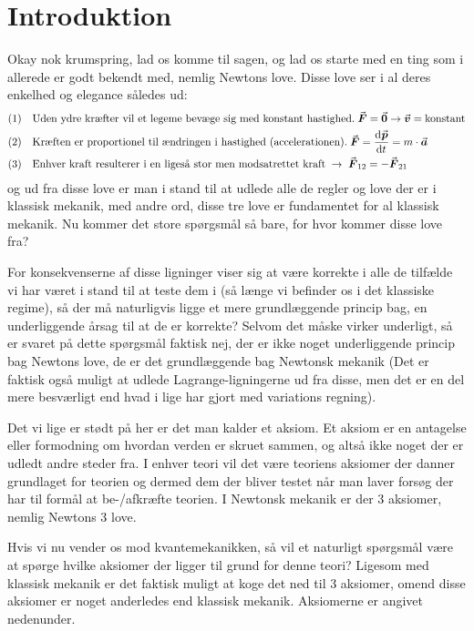 \documentclass[../Kvantemekanik.tex]{subfiles}
\begin{document}
\section{Introduktion}
Okay nok krumspring, lad os komme til sagen, og lad os starte med en ting som i allerede er godt bekendt med, nemlig Newtons love. Disse love ser i al deres enkelhed og elegance således ud:
\begin{align*}
    (1)\quad & \text{Uden ydre kræfter vil et legeme bevæge sig med konstant hastighed.} \; \v F=\v 0 \rightarrow \v v=\text{konstant}\\
    (2)\quad & \text{Kræften er proportionel til ændringen i hastighed (accelerationen).}\; \v F=\dif{t}{\v p}=m\cdot \v a\\
    (3)\quad & \text{Enhver kraft resulterer i en ligeså stor men modsatrettet kraft}\; \rightarrow \; \v F_{12}=-\v F_{21}
\end{align*}
og ud fra disse love er man i stand til at udlede alle de regler og love der er i klassisk mekanik, med andre ord, disse tre love er fundamentet for al klassisk mekanik. Nu kommer det store spørgsmål så bare, for hvor kommer disse love fra?

For konsekvenserne af disse ligninger viser sig at være korrekte i alle de tilfælde vi har været i stand til at teste dem i (så længe vi befinder os i det klassiske regime), så der må naturligvis ligge et mere grundlæggende princip bag, en underliggende årsag til at de er korrekte? Selvom det måske virker underligt, så er svaret på dette spørgsmål faktisk nej, der er ikke noget underliggende princip bag Newtons love, de er det grundlæggende bag Newtonsk mekanik (Det er faktisk også muligt at udlede Lagrange-ligningerne ud fra disse, men det er en del mere besværligt end hvad i lige har gjort med variations regning).

Det vi lige er stødt på her er det man kalder et aksiom. Et aksiom er en antagelse eller formodning om hvordan verden er skruet sammen, og altså ikke noget der er udledt andre steder fra. I enhver teori vil det være teoriens aksiomer der danner grundlaget for teorien og dermed dem der bliver testet når man laver forsøg der har til formål at be-/afkræfte teorien. I Newtonsk mekanik er der 3 aksiomer, nemlig Newtons 3 love.

Hvis vi nu vender os mod kvantemekanikken, så vil et naturligt spørgsmål være at spørge hvilke aksiomer der ligger til grund for denne teori? Ligesom med klassisk mekanik er det faktisk muligt at koge det ned til 3 aksiomer, omend disse aksiomer er noget anderledes end klassisk mekanik. Aksiomerne er angivet nedenunder.
\end{document}
